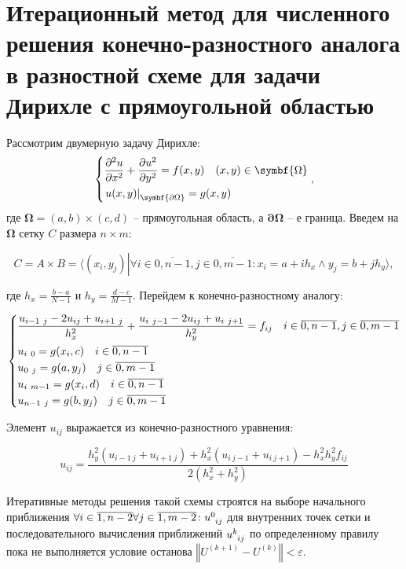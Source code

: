 \documentclass[__main__.tex]{subfiles}
\begin{document}
\section{Итерационный метод для численного решения конечно-разностного аналога в разностной схеме для задачи Дирихле с прямоугольной областью}

Рассмотрим двумерную задачу Дирихле:
\begin{gather*}
\left\{
\begin{gathered}
\frac{\partial^2 u}{\partial x^2} + \frac{\partial u^2}{\partial y^2} = f(x,y)
\quad (x,y)\in\symbf{\Omega}
\hfill\\
\left.u(x,y)\right|_{\symbf{\partial\Omega}} = g(x,y)
\hfill\\
\end{gathered}
\right.,
\end{gather*}
где $\symbf{\Omega}=(a,b)\times(c,d)$ -- прямоугольная область, а $\symbf{\partial\Omega}$ -- е граница. Введем на $\symbf{\Omega}$ сетку $C$ размера $n \times m$:

$$
C = A \times B = \langle \left.(x_i,y_j)\right|\forall i\in\overline{0,n-1},j\in\overline{0,m-1}\colon x_i = a + ih_x \wedge y_j = b + jh_y\rangle,
$$

где $h_x=\frac{b-a}{N-1}$ и $h_y=\frac{d-c}{M-1}$. Перейдем к конечно-разностному аналогу:

\begin{gather*}
\left\{
\begin{gathered}
\frac{u_{i-1 \ j} -2u_{ij}+u_{i+1 \ j}}{h_x^2} + \frac{u_{i \ j-1} - 2u_{ij} + u_{i \ j+1}}{h_y^2}
=
f_{ij}
\quad
i\in\overline{0,n-1},j\in\overline{0,m-1}
\hfill\\
u_{i\ 0} = g(x_i, c)
\quad
i\in\overline{0,n-1}
\hfill\\
u_{0\ j} = g(a, y_j)
\quad
j\in\overline{0,m-1}
\hfill\\
u_{i\ m-1} = g(x_i, d)
\quad
i\in\overline{0,n-1}
\hfill\\
u_{n-1\ j} = g(b, y_j)
\quad
j\in\overline{0,m-1}
\hfill\\
\end{gathered}
\right.
\end{gather*}

Элемент $u_{ij}$ выражается из конечно-разностного уравнения:

$$
u_{ij}
=
\frac
{h_y^2(u_{i-1\ j} + u_{i+1\ j}) + h_x^2(u_{i\ j-1} + u_{i\ j+1}) - h_x^2h_y^2f_{ij}}
{2(h_x^2+h_y^2)}
$$

Итеративные методы решения такой схемы строятся на выборе начального приближения $\forall i\in\overline{1,n-2}\forall j\in\overline{1,m-2}\colon u\indices{^0_i_j}$ для внутренних точек сетки и последовательного вычисления приближений $u\indices{^k_i_j}$ по определенному правилу пока не выполняется условие останова $\left\Vert U^{(k+1)} - U^{(k)}\right\Vert < \varepsilon$.
\end{document}
